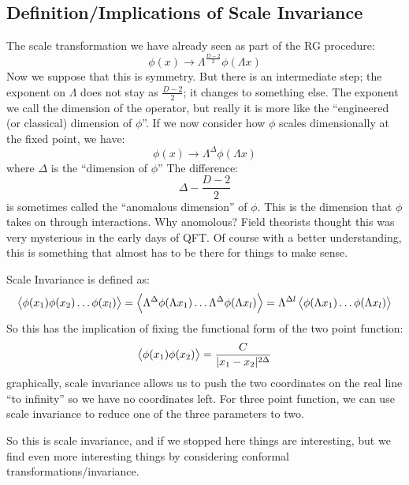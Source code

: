 \subsection{Definition/Implications of Scale Invariance}
The scale transformation we have already seen as part of the RG procedure:
\begin{equation}
    \phi(x) \to \Lambda^{\frac{D-2}{2}}\phi(\Lambda x)
\end{equation}
Now we suppose that this is symmetry. But there is an intermediate step; the exponent on $\Lambda$ does not stay as $\frac{D-2}{2}$; it changes to something else. The exponent we call the dimension of the operator, but really it is more like the ``engineered (or classical) dimension of $\phi$''. If we now consider how $\phi$ scales dimensionally at the fixed point, we have:
\begin{equation}
    \phi(x) \to \Lambda^{\Delta}\phi(\Lambda x)
\end{equation}
where $\Delta$ is the ``dimension of $\phi$'' The difference:
\begin{equation}
    \Delta - \frac{D-2}{2}
\end{equation}
is sometimes called the ``anomalous dimension'' of $\phi$. This is the dimension that $\phi$ takes on through interactions. Why anomolous? Field theorists thought this was very mysterious in the early days of QFT. Of course with a better understanding, this is something that almost has to be there for things to make sense.

Scale Invariance is defined as:
\begin{equation}
    \avg{\phi(x_1)\phi(x_2)\ldots\phi(x_l)} = \avg{\Lambda^\Delta\phi(\Lambda x_1)\ldots \Lambda^\Delta\phi(\Lambda x_l)} = \Lambda^{\Delta l}\avg{\phi(\Lambda x_1)\ldots \phi(\Lambda x_l)}
\end{equation}
So this has the implication of fixing the functional form of the two point function:
\begin{equation}
    \avg{\phi(x_1)\phi(x_2)} = \frac{C}{\abs{x_1 - x_2}^{2\Delta}}
\end{equation}
graphically, scale invariance allows us to push the two coordinates on the real line ``to infinity'' so we have no coordinates left. For three point function, we can use scale invariance to reduce one of the three parameters to two.

So this is scale invariance, and if we stopped here things are interesting, but we find even more interesting things by considering conformal transformations/invariance.

